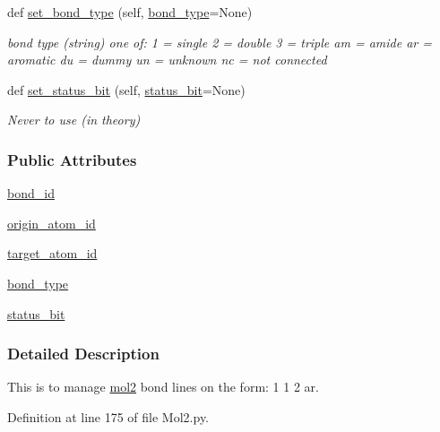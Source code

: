 \begin{DoxyCompactItemize}
def \hyperlink{classsrc_1_1Mol2_1_1mol2__bond_aee8fcdcc674648c140ef84f5562cbe9c}{set\+\_\+bond\+\_\+type} (self, \hyperlink{classsrc_1_1Mol2_1_1mol2__bond_a7219155d68989a8dc784453b761b7c3b}{bond\+\_\+type}=None)
\begin{DoxyCompactList}\small\item\em bond type (string) one of\+: 1 = single 2 = double 3 = triple am = amide ar = aromatic du = dummy un = unknown nc = not connected \end{DoxyCompactList}\item 
def \hyperlink{classsrc_1_1Mol2_1_1mol2__bond_a626117c036a1736d76176e5af3c2e69a}{set\+\_\+status\+\_\+bit} (self, \hyperlink{classsrc_1_1Mol2_1_1mol2__bond_a6ecf583fc88ad0976bd05ead4c8d409c}{status\+\_\+bit}=None)
\begin{DoxyCompactList}\small\item\em Never to use (in theory) \end{DoxyCompactList}\end{DoxyCompactItemize}
\subsubsection*{Public Attributes}
\begin{DoxyCompactItemize}
\item 
\hyperlink{classsrc_1_1Mol2_1_1mol2__bond_afe6abbb34e33f4ba7fe25d8e1d62683a}{bond\+\_\+id}
\item 
\hyperlink{classsrc_1_1Mol2_1_1mol2__bond_a5398fa9b38fd91b27365db7371ec6690}{origin\+\_\+atom\+\_\+id}
\item 
\hyperlink{classsrc_1_1Mol2_1_1mol2__bond_ae2417295a726650e16cc71984487d37d}{target\+\_\+atom\+\_\+id}
\item 
\hyperlink{classsrc_1_1Mol2_1_1mol2__bond_a7219155d68989a8dc784453b761b7c3b}{bond\+\_\+type}
\item 
\hyperlink{classsrc_1_1Mol2_1_1mol2__bond_a6ecf583fc88ad0976bd05ead4c8d409c}{status\+\_\+bit}
\end{DoxyCompactItemize}


\subsubsection{Detailed Description}
This is to manage \hyperlink{classsrc_1_1Mol2_1_1mol2}{mol2} bond lines on the form\+: 1 1 2 ar. 

Definition at line 175 of file Mol2.\+py.




